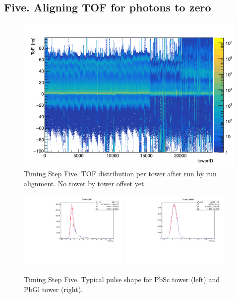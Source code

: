 \documentclass{article}
\begin{document}
\subsection{Five. Aligning TOF for photons to zero}
\begin{figure}
\includegraphics[width=\textwidth]{fig_pi0vn/TOF.png}
\caption{Timing Step Five. TOF distribution per tower after run by run alignment. No tower by tower offset yet.}
\label{fig.tim.five.one}
\end{figure}
\begin{figure}
\includegraphics[width=0.47\textwidth]{fig_pi0vn/TOF_t205.pdf}
\includegraphics[width=0.47\textwidth]{fig_pi0vn/TOF_t20005.pdf}
\caption{Timing Step Five. Typical pulse shape for PbSc tower (left) and PbGl tower (right).}
\label{fig.tim.five.two}
\end{figure}
\end{document}
